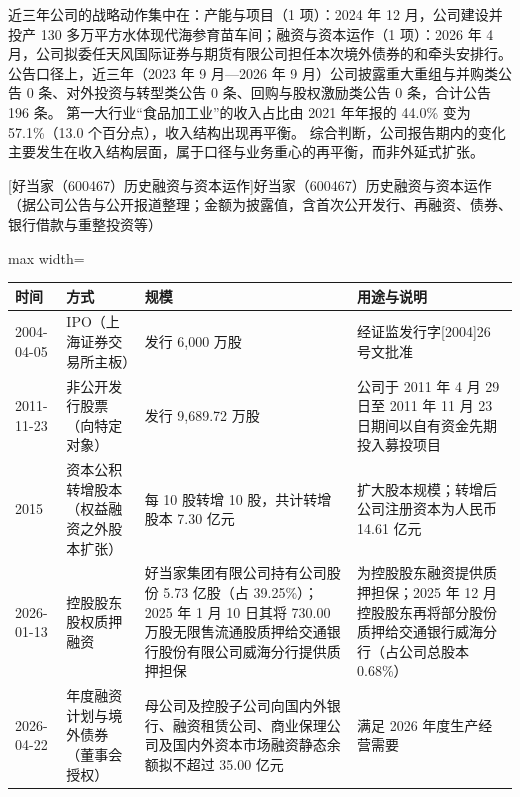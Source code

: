  近三年公司的战略动作集中在：产能与项目（1 项）：2024 年 12 月，公司建设并投产 130 多万平方水体现代海参育苗车间；融资与资本运作（1 项）：2026 年 4 月，公司拟委任天风国际证券与期货有限公司担任本次境外债券的和牵头安排行。 公告口径上，近三年（2023 年 9 月---2026 年 9 月）公司披露重大重组与并购类公告 0 条、对外投资与转型类公告 0 条、回购与股权激励类公告 0 条，合计公告 196 条。 第一大行业“食品加工业”的收入占比由 2021 年年报的 44.0\% 变为 57.1\%（13.0 个百分点），收入结构出现再平衡。 综合判断，公司报告期内的变化主要发生在收入结构层面，属于口径与业务重心的再平衡，而非外延式扩张。

\begin{center}\small\setlength{\tabcolsep}{4pt}
[好当家（600467）历史融资与资本运作]{好当家（600467）历史融资与资本运作（据公司公告与公开报道整理；金额为披露值，含首次公开发行、再融资、债券、银行借款与重整投资等）}
\begin{adjustbox}{max width=\textwidth}
\begin{tabular}{@{}p{1.45cm}p{2.55cm}p{4.05cm}p{4.95cm}@{}}
\toprule
时间 & 方式 & 规模 & 用途与说明 \\
\midrule
2004-04-05 & IPO（上海证券交易所主板） & 发行 6,\allowbreak{}000 万股 & 经证监发行字[2004]26 号文批准 \\
2011-11-23 & 非公开发行股票（向特定对象） & 发行 9,\allowbreak{}689.72 万股 & 公司于 2011 年 4 月 29 日至 2011 年 11 月 23 日期间以自有资金先期投入募投项目 \\
2015 & 资本公积转增股本（权益融资之外股本扩张） & 每 10 股转增 10 股，\allowbreak{}共计转增股本 7.30 亿元 & 扩大股本规模；转增后公司注册资本为人民币 14.61 亿元 \\
2026-01-13 & 控股股东股权质押融资 & 好当家集团有限公司持有公司股份 5.73 亿股（占 39.25\%）；2025 年 1 月 10 日其将 730.00 万股无限售流通股质押给交通银行股份有限公司威海分行提供质押担保 & 为控股股东融资提供质押担保；2025 年 12 月控股股东再将部分股份质押给交通银行威海分行（占公司总股本 0.68\%） \\
2026-04-22 & 年度融资计划与境外债券（董事会授权） & 母公司及控股子公司向国内外银行、\allowbreak{}融资租赁公司、\allowbreak{}商业保理公司及国内外资本市场融资静态余额拟不超过 35.00 亿元 & 满足 2026 年度生产经营需要 \\
\bottomrule
\end{tabular}
\end{adjustbox}
\end{center}

